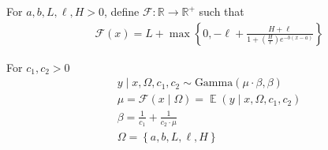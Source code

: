 \documentclass[a4paper,12pt]{article}
\DeclareMathOperator{\E}{\mathbb{E}}
\begin{document}
    For $a, b, L, \ell, H > 0$, define $\mathcal{F}: \mathbb{R} \to \mathbb{R}^{+}$ such that
    \begin{align*}
        &\mathcal{F}\left(x\right) = L + \max\left\{0, -\ell + \frac{H + \ell}{1 + \left(\frac{H}{\ell}\right)e^{-b\left(x-a\right)}} \right\} \tag{4.2.1}
    \end{align*}


For $c_1, c_2 > 0$
    \begin{align*}
        &y \mid x, \Omega, c_1, c_2 \sim \text{Gamma}\left(\mu\cdot\beta, \beta\right) \tag{4.2.2}\\
        &\mu = \mathcal{F}\left(x \mid \Omega\right) = \E\left(y \mid x, \Omega, c_1, c_2\right) \tag{4.2.3}\\
        &\beta = \frac{1}{c_1} + \frac{1}{c_2\cdot\mu} \tag{4.2.2}\\
        &{\Omega} = \left\{a, b, L, \ell, H\right\} \tag{4.2.4}\\
    \end{align*}
\end{document}
